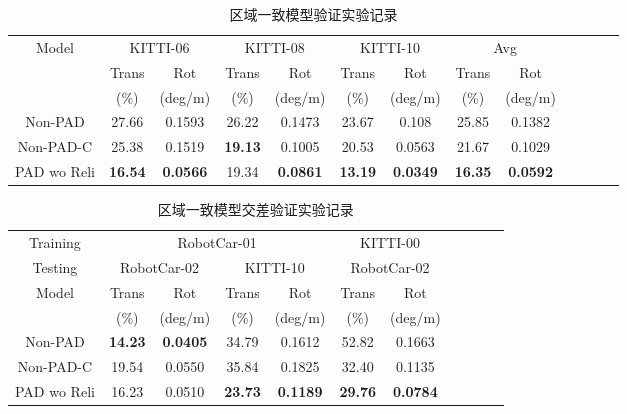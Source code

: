 \begin{table*}[h]
\caption{区域一致模型验证实验记录}
\begin{center}
\begin{tabular}{c c c c c c c c c c c c c }
\toprule
\multirow{3}{*}{Model}  &\multicolumn{2}{c}{KITTI-06} &\multicolumn{2}{c}{KITTI-08} & \multicolumn{2}{c}{KITTI-10}& \multicolumn{2}{c}{Avg}\\
\cline{2-3}  \cline{4-5}  \cline{6-7} \cline{8-9} 
& Trans & Rot  & Trans & Rot &Trans & Rot& Trans & Rot\\ 
& (\%) & (deg/m)  & (\%) & (deg/m)& (\%) & (deg/m) & (\%) & (deg/m)\\
\midrule
 Non-PAD     &27.66&0.1593&26.22&0.1473&23.67&0.108&25.85&0.1382 \\
 Non-PAD-C   &25.38&0.1519&\textbf{19.13}&0.1005&20.53&0.0563&21.67&0.1029\\
 \midrule
 PAD wo Reli &\textbf{16.54}&\textbf{0.0566}&19.34&\textbf{0.0861}&\textbf{13.19}&\textbf{0.0349}&\textbf{16.35}& \textbf{0.0592}\\
\bottomrule
\end{tabular}
\end{center}
\label{tab:pad_model_compare}
\end{table*}

\begin{table*}[h]
  \caption{区域一致模型交差验证实验记录}
  \begin{center}
  \begin{tabular}{c c c c c c c c c c c }
  \toprule
Training &\multicolumn{4}{c}{RobotCar-01} &\multicolumn{2}{c}{KITTI-00} \\
\cline{2-7}
Testing  &\multicolumn{2}{c}{RobotCar-02} &\multicolumn{2}{c}{KITTI-10} & \multicolumn{2}{c}{RobotCar-02}\\
  \cline{1-3}  \cline{4-5}  \cline{6-7} \cline{8-9} 
  \multirow{2}{*}{Model}  & Trans & Rot  & Trans & Rot &Trans & Rot\\ 
  & (\%) & (deg/m)  & (\%) & (deg/m)& (\%) & (deg/m) \\
  \midrule
   Non-PAD     &\textbf{14.23}&\textbf{0.0405}&34.79&0.1612&52.82&0.1663\\
   Non-PAD-C   &19.54&0.0550&35.84&0.1825&32.40&0.1135\\
   \midrule
   PAD wo Reli &16.23&0.0510&\textbf{23.73}&\textbf{0.1189}&\textbf{29.76}&\textbf{0.0784} \\
  \bottomrule
  \end{tabular}
  \end{center}
  \label{tab:pad_model_compare_2}
  \end{table*}

